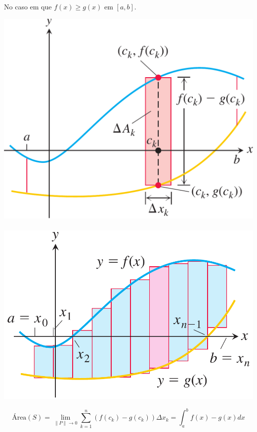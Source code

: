 \begin{frame}
No caso em que $f(x)\geq g(x)$ em $[a,b]$.

\begin{center}
\includegraphics[scale=0.6]{area-curvas-th-3.png} \ \ \ 
\includegraphics[scale=0.7]{area-curvas-th-2.png}
\end{center}

\[\text{Área}(S)=\lim_{\|P\|\to 0}\sum_{k=1}^{n}(f(c_k)-g(c_k))\Delta x_k=\int_a^b f(x)-g(x)dx\]
\end{frame}


